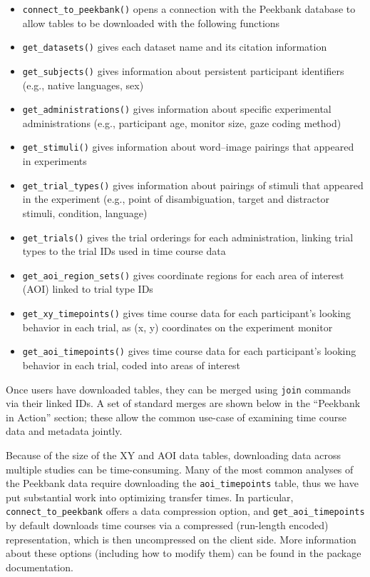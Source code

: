 \documentclass[
  english,
  man,floatsintext]{apa6}
\providecommand{\tightlist}{%
  \setlength{\itemsep}{0pt}\setlength{\parskip}{0pt}}
\begin{document}
\begin{itemize}
\tightlist
\item
  \texttt{connect\_to\_peekbank()} opens a connection with the Peekbank database to allow tables to be downloaded with the following functions
\item
  \texttt{get\_datasets()} gives each dataset name and its citation information
\item
  \texttt{get\_subjects()} gives information about persistent participant identifiers (e.g., native languages, sex)
\item
  \texttt{get\_administrations()} gives information about specific experimental administrations (e.g., participant age, monitor size, gaze coding method)
\item
  \texttt{get\_stimuli()} gives information about word--image pairings that appeared in experiments\\
\item
  \texttt{get\_trial\_types()} gives information about pairings of stimuli that appeared in the experiment (e.g., point of disambiguation, target and distractor stimuli, condition, language)
\item
  \texttt{get\_trials()} gives the trial orderings for each administration, linking trial types to the trial IDs used in time course data
\item
  \texttt{get\_aoi\_region\_sets()} gives coordinate regions for each area of interest (AOI) linked to trial type IDs
\item
  \texttt{get\_xy\_timepoints()} gives time course data for each participant's looking behavior in each trial, as (x, y) coordinates on the experiment monitor
\item
  \texttt{get\_aoi\_timepoints()} gives time course data for each participant's looking behavior in each trial, coded into areas of interest
\end{itemize}

Once users have downloaded tables, they can be merged using \texttt{join} commands via their linked IDs. A set of standard merges are shown below in the ``Peekbank in Action'' section; these allow the common use-case of examining time course data and metadata jointly.

Because of the size of the XY and AOI data tables, downloading data across multiple studies can be time-consuming. Many of the most common analyses of the Peekbank data require downloading the \texttt{aoi\_timepoints} table, thus we have put substantial work into optimizing transfer times. In particular, \texttt{connect\_to\_peekbank} offers a data compression option, and \texttt{get\_aoi\_timepoints} by default downloads time courses via a compressed (run-length encoded) representation, which is then uncompressed on the client side. More information about these options (including how to modify them) can be found in the package documentation.
\end{document}
